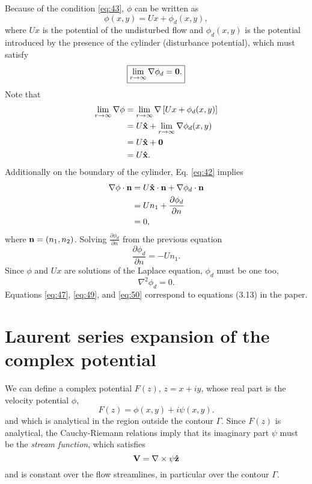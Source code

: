 \documentclass[11pt]{article}
\begin{document}
Because of the condition \eqref{eq:43}, $\phi$ can be written as
\begin{equation}
  \label{eq:45}
  \phi(x,y) = U x + \phi_d(x,y),
\end{equation}
where $U x$ is the potential of the undisturbed flow and $\phi_d(x,y)$ is the potential introduced by the presence of the cylinder (disturbance potential), which must satisfy
\begin{equation}
  \label{eq:47}
  \boxed{
    \lim_{r\rightarrow\infty} \nabla\phi_d = {\bf 0}.
    }
\end{equation}
Note that
\begin{align}
  \lim_{r\rightarrow\infty} \nabla\phi &= \lim_{r\rightarrow\infty} \nabla\left[U x + \phi_d(x,y)\right] \\
                                       &= U {\bf\hat{x}} + \lim_{r\rightarrow\infty} \nabla\phi_d(x,y) \\
                                       &= U {\bf\hat{x}} + {\bf 0} \\
                                       &= U {\bf\hat{x}}.
\end{align}
Additionally on the boundary of the cylinder, Eq. \eqref{eq:42} implies
\begin{align}
  \label{eq:48}
  \nabla\phi\cdot{\bf n} &= U{\bf\hat{x}}\cdot{\bf n} + \nabla\phi_d\cdot{\bf n} \\
                         &= U n_1 + \frac{\partial\phi_d}{\partial n} \\
                         &= 0,
\end{align}
where ${\bf n} = (n_1, n_2)$. Solving $\frac{\partial\phi_d}{\partial n}$ from the previous equation
\begin{equation}
  \label{eq:49}
  \boxed{
    \frac{\partial\phi_d}{\partial n} = -U n_1.
    }
  \end{equation}
  Since $\phi$ and $U x$ are solutions of the Laplace equation, $\phi_d$ must be one too,
  \begin{equation}
    \label{eq:50}
    \boxed{
      \nabla^2 \phi_d = 0.
      }
  \end{equation}
Equations \eqref{eq:47}, \eqref{eq:49}, and \eqref{eq:50} correspond to equations (3.13) in the paper.

\section{Laurent series expansion of the complex potential}
We can define a complex potential $F(z)$, $z=x + iy$, whose real part is the velocity potential $\phi$,
\begin{equation}
  \label{eq:51}
  F(z) = \phi(x,y) + i \psi(x,y).
\end{equation}
and which is analytical in the region outside the contour $\Gamma$. Since $F(z)$ is analytical, the Cauchy-Riemann relations imply that its imaginary part $\psi$ must be the {\it stream function}, which satisfies
\begin{equation}
  \label{eq:1}
  {\bf V} = \nabla\times \psi{\bf\hat{z}}
\end{equation}
and is constant over the flow streamlines, in particular over the contour $\Gamma$.
\end{document}
